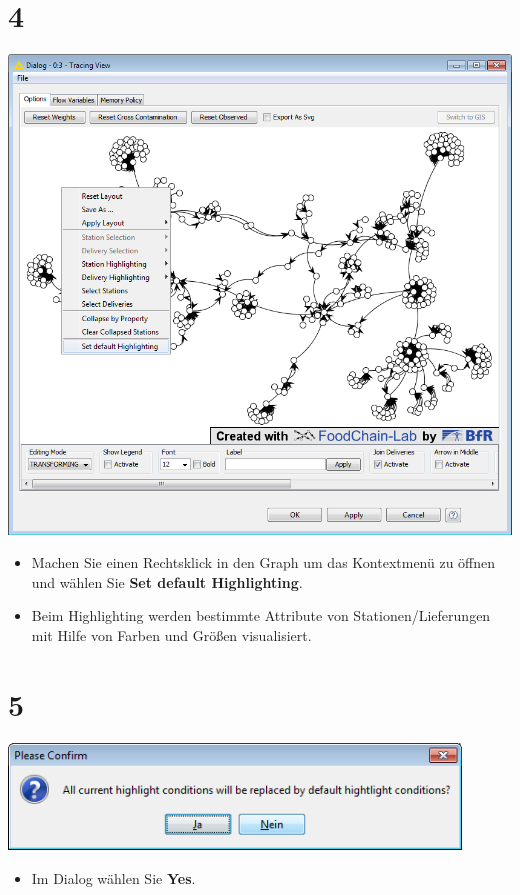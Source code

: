 \documentclass{beamer}
\begin{document}
\section{4}
\begin{frame}
	\begin{center}
  		\includegraphics[height=0.6\textheight]{4.png}
	\end{center}
	\begin{itemize}
		\item Machen Sie einen Rechtsklick in den Graph um das Kontextmenü zu öffnen und wählen Sie \textbf{Set default Highlighting}.
		\item Beim Highlighting werden bestimmte Attribute von Stationen/Lieferungen mit Hilfe von Farben und Größen visualisiert.
	\end{itemize}
\end{frame}

\section{5}
\begin{frame}
	\begin{center}
  		\includegraphics[width=0.9\textwidth]{5.png}
	\end{center}
	\begin{itemize}
		\item Im Dialog wählen Sie \textbf{Yes}.
	\end{itemize}
\end{frame}
\end{document}
